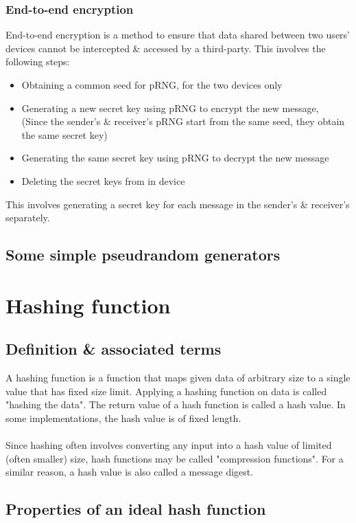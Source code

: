 \subsection{End-to-end encryption}
End-to-end encryption is a method to ensure that data shared between two users' devices cannot be intercepted \& accessed by a third-party. This involves the following steps:
\begin{itemize}
	\item Obtaining a common seed for pRNG, for the two devices only
	\item Generating a new secret key using pRNG to encrypt the new message,\\
	(Since the sender's \& receiver's pRNG start from the same seed, they obtain the same secret key)
	\item Generating the same secret key using pRNG to decrypt the new message
	\item Deleting the secret keys from in device
\end{itemize}
This involves generating a secret key for each message in the sender's \& receiver's separately.

\section{Some simple pseudrandom generators}


\chapter{Hashing function}
\section{Definition \& associated terms}
A hashing function is a function that maps given data of arbitrary size to a single value that has fixed size limit. Applying a hashing function on data is called "hashing the data". The return value of a hash function is called a hash value. In some implementations, the hash value is of fixed length.
\\~\\
Since hashing often involves converting any input into a hash value of limited (often smaller) size, hash functions may be called "compression functions". For a similar reason, a hash value is also called a message digest.

\section{Properties of an ideal hash function}
